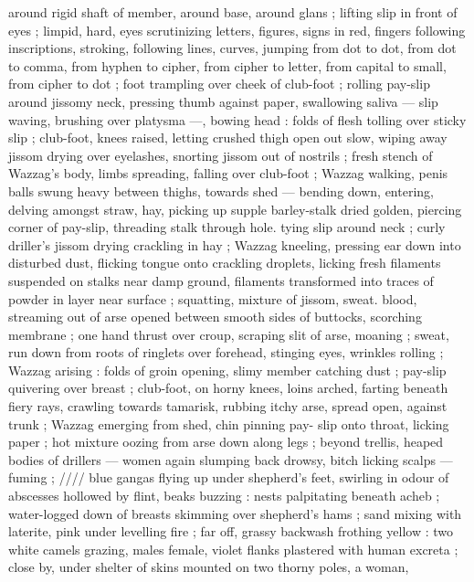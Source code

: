 {around rigid shaft of member, around base, around glans ; lifting slip 
in front of eyes ; limpid, hard, eyes scrutinizing letters, figures, signs 
in red, fingers following inscriptions, stroking, following lines, 
curves, jumping from dot to dot, from dot to comma, from hyphen to 
cipher, from cipher to letter, from capital to small, from cipher to dot 
; foot trampling over cheek of club-foot ; rolling pay-slip around 
jissomy neck, pressing thumb against paper, swallowing saliva --- 
slip waving, brushing over platysma ---, bowing head : folds of flesh 
tolling over sticky slip ; club-foot, knees raised, letting crushed thigh 
open out slow, wiping away jissom drying over eyelashes, snorting 
jissom out of nostrils ; fresh stench of Wazzag's body, limbs 
spreading, falling over club-foot ; Wazzag walking, penis balls swung 
heavy between thighs, towards shed --- bending down, entering, 
delving amongst straw, hay, picking up supple barley-stalk dried 
golden, piercing corner of pay-slip, threading stalk through hole. 
tying slip around neck ; curly driller's jissom drying crackling in hay 
; Wazzag kneeling, pressing ear down into disturbed dust, flicking 
tongue onto crackling droplets, licking fresh filaments suspended on 
stalks near damp ground, filaments transformed into traces of 
powder in layer near surface ; squatting, mixture of jissom, sweat. 
blood, streaming out of arse opened between smooth sides of 
buttocks, scorching membrane ; one hand thrust over croup, scraping 
slit of arse, moaning ; sweat, run down from roots of ringlets over 
forehead, stinging eyes, wrinkles rolling ; Wazzag arising : folds of 
groin opening, slimy member catching dust ; pay-slip quivering over 
breast ; club-foot, on horny knees, loins arched, farting beneath 
fiery rays, crawling towards tamarisk, rubbing itchy arse, spread 
open, against trunk ; Wazzag emerging from shed, chin pinning pay- 
slip onto throat, licking paper ; hot mixture oozing from arse down 
along legs ; beyond trellis, heaped bodies of drillers --- women 
again slumping back drowsy, bitch licking scalps --- fuming ; {\slash}{\slash}{\slash}{\slash} blue 
gangas flying up under shepherd's feet, swirling in odour of 
abscesses hollowed by flint, beaks buzzing : nests palpitating 
beneath acheb ; water-logged down of breasts skimming over 
shepherd's hams ; sand mixing with laterite, pink under levelling fire 
; far off, grassy backwash frothing yellow : two white camels grazing, 
males female, violet flanks plastered with human excreta ; close by, 
under shelter of skins mounted on two thorny poles, a woman, 
}
